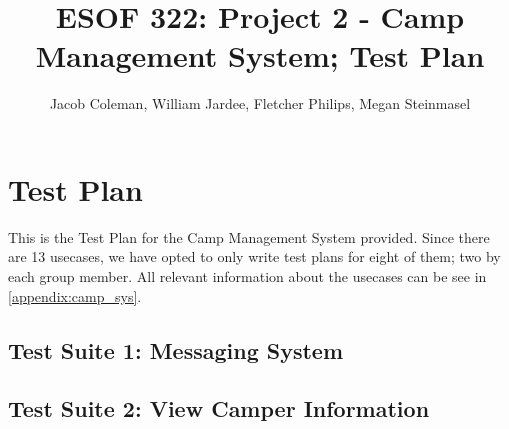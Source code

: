 \documentclass[11pt]{article}
\begin{document}
\title{ESOF 322: Project 2 - Camp Management System; Test Plan}
\author{Jacob Coleman, William Jardee, Fletcher Philips, Megan Steinmasel}
\maketitle




\section*{Test Plan}

This is the Test Plan for the Camp Management System provided. Since there are 13 usecases, we have opted to only write test plans for eight of them; two by each group member. All relevant information about the usecases can be see in \cref{appendix:camp_sys}.



\subsection*{Test Suite 1: Messaging System}




\subsection*{Test Suite 2: View Camper Information}
\end{document}
